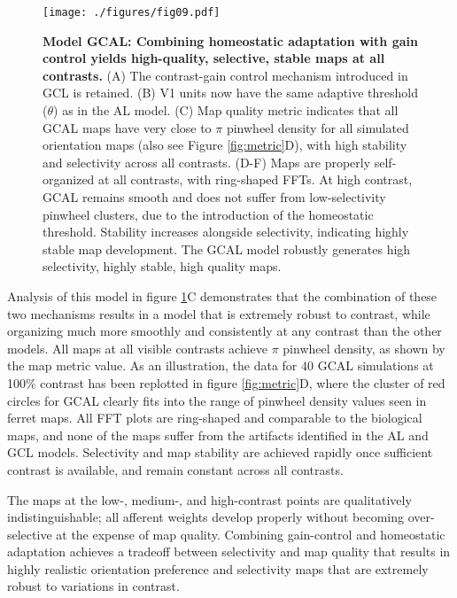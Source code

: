 \documentclass{article}
\def \scalefactor {0.666666}
\def \GaussianScale {\scalefactor}         %
\begin{document}
\begin{figure}
\centerline{
\texttt{[image: ./figures/fig09.pdf]}
}

\caption[]{\textbf{Model GCAL: Combining homeostatic
    adaptation with gain control yields high-quality, selective,
    stable maps at all contrasts.} (A) The contrast-gain
  control mechanism introduced in GCL is retained. (B) V1 units now
  have the same adaptive threshold ($\theta$) as in the AL model.  (C)
  Map quality metric indicates that all GCAL maps have very close to $\pi$
  pinwheel density for all simulated orientation maps (also see Figure
  \ref{fig:metric}D), with high stability and selectivity across all
  contrasts. (D-F) Maps are properly self-organized at all contrasts,
  with ring-shaped FFTs. At high contrast, GCAL remains smooth and
  does not suffer from low-selectivity pinwheel clusters, due to the
  introduction of the homeostatic threshold. Stability increases
  alongside selectivity, indicating highly stable map development. The
  GCAL model robustly generates high selectivity, highly stable,
  high quality maps.}
\label{fig:gaussian_GCAL}

\end{figure}

Analysis of this model in figure \ref{fig:gaussian_GCAL}C
demonstrates that the combination of these two mechanisms results in a
model that is extremely robust to contrast, while organizing much more
smoothly and consistently at any contrast than the other models. All
maps at all visible contrasts achieve $\pi$ pinwheel density, as shown
by the map metric value.  As an illustration, the data for $40$ GCAL
simulations at 100\% contrast has been replotted in figure
\ref{fig:metric}D, where the cluster of red circles for
GCAL clearly fits into the range of pinwheel
density values seen in ferret maps. All FFT plots are ring-shaped and comparable to the
biological maps, and none of the maps suffer from the artifacts identified
in the AL and GCL models. Selectivity and map stability are achieved
rapidly once sufficient contrast is available, and remain constant
across all contrasts.

The maps at the low-, medium-, and high-contrast points are
qualitatively indistinguishable; all afferent weights develop properly
without becoming over-selective at the expense of map
quality. Combining gain-control and homeostatic adaptation achieves a
tradeoff between selectivity and map quality that results in highly
realistic orientation preference and selectivity maps that are
extremely robust to variations in contrast.
\end{document}
